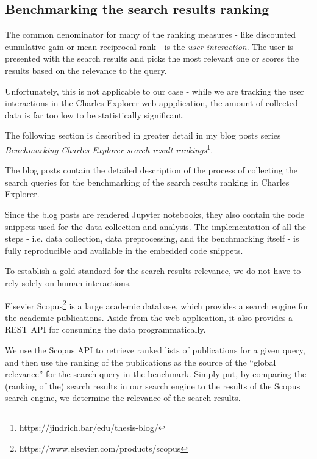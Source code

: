 \subsection{Benchmarking the search results ranking}

The common denominator for many of the ranking measures - like discounted cumulative gain or mean reciprocal rank - is the \textit{user interaction}.
The user is presented with the search results and picks the most relevant one or scores the results based on the relevance to the query.

Unfortunately, this is not applicable to our case - while we are tracking the user interactions in the Charles Explorer web appplication, the amount of collected data is far too low to be statistically significant.

\begin{mybox}{}
    The following section is described in greater detail in my blog posts series \textit{Benchmarking Charles Explorer search result rankings}\footnote{\url{https://jindrich.bar/edu/thesis-blog/}}.
    
    The blog posts contain the detailed description of the process of collecting the search queries for the benchmarking of the search results ranking in Charles Explorer.

    Since the blog posts are rendered Jupyter notebooks, they also contain the code snippets used for the data collection and analysis.
    The implementation of all the steps - i.e. data collection, data preprocessing, and the benchmarking itself - is fully reproducible and available in the embedded code snippets.
\end{mybox}

To establish a gold standard for the search results relevance, we do not have to rely solely on human interactions.

Elsevier Scopus\footnote{https://www.elsevier.com/products/scopus} is a large academic database, which provides a search engine for the academic publications.
Aside from the web application, it also provides a REST API for consuming the data programmatically.

We use the Scopus API to retrieve ranked lists of publications for a given query, and then use the ranking of the publications as the source of the ``global relevance'' for the search query in the benchmark.
Simply put, by comparing the (ranking of the) search results in our search engine to the results of the Scopus search engine, we determine the relevance of the search results.

